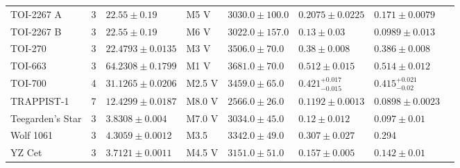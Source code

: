 \begin{tabular}{lrllllll}
TOI-2267 A & 3 & $22.55 \pm 0.19$ & M5 V & $3030.0 \pm 100.0$ & $0.2075 \pm 0.0225$ & $0.171 \pm 0.0079$ & \cite{ZUNIGA_FERNANDEZ_ET_AL_2025} \\
TOI-2267 B & 3 & $22.55 \pm 0.19$ & M6 V & $3022.0 \pm 157.0$ & $0.13 \pm 0.03$ & $0.0989 \pm 0.013$ & \cite{EXOFOP} \\
TOI-270 & 3 & $22.4793 \pm 0.0135$ & M3 V & $3506.0 \pm 70.0$ & $0.38 \pm 0.008$ & $0.386 \pm 0.008$ & \cite{KAYE_ET_AL__2022} \\
TOI-663 & 3 & $64.2308 \pm 0.1799$ & M1 V & $3681.0 \pm 70.0$ & $0.512 \pm 0.015$ & $0.514 \pm 0.012$ & \cite{COINTEPAS_ET_AL__2024} \\
TOI-700 & 4 & $31.1265 \pm 0.0206$ & M2.5 V & $3459.0 \pm 65.0$ & $0.421^{+0.017}_{-0.015}$ & $0.415^{+0.021}_{-0.02}$ & \cite{GILBERT_ET_AL_2023} \\
TRAPPIST-1 & 7 & $12.4299 \pm 0.0187$ & M8.0 V & $2566.0 \pm 26.0$ & $0.1192 \pm 0.0013$ & $0.0898 \pm 0.0023$ & \cite{AGOL_ET_AL__2021} \\
Teegarden's Star & 3 & $3.8308 \pm 0.004$ & M7.0 V & $3034.0 \pm 45.0$ & $0.12 \pm 0.012$ & $0.097 \pm 0.01$ & \cite{DREIZLER_ET_AL_2024} \\
Wolf 1061 & 3 & $4.3059 \pm 0.0012$ & M3.5 & $3342.0 \pm 49.0$ & $0.307 \pm 0.027$ & 0.294 & \cite{ASTUDILLO_DEFRU_ET_AL__2017} \\
YZ Cet & 3 & $3.7121 \pm 0.0011$ & M4.5 V & $3151.0 \pm 51.0$ & $0.157 \pm 0.005$ & $0.142 \pm 0.01$ & \cite{STOCK_ET_AL__2020} \\
\bottomrule
\end{tabular}
